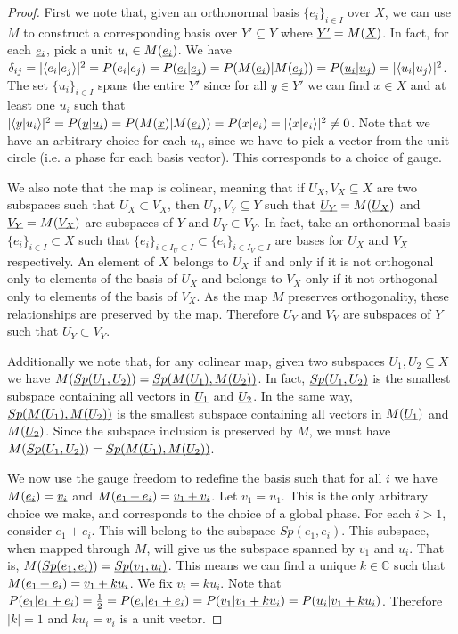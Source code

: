 \documentclass[aps,prl,amsmath,amssymb,twocolumn,nofootinbib]{revtex4}
\theoremstyle{plain}
\theoremstyle{definition}
\theoremstyle{remark}
\newcommand{\pj}[1] {\underbar{$#1$}}
\def\>{\rangle}
\def\<{\langle}
\begin{document}
	\begin{proof}
		First we note that, given an orthonormal basis $\{e_i\}_{i \in I}$ over $X$, we can use $M$ to construct a corresponding basis over $Y' \subseteq Y$ where $\pj{Y'} = M(\pj{X})$. In fact, for each $\pj{e_i}$, pick a unit $u_i \in M(\pj{e_i})$. We have $\delta_{ij} = |\<e_i | e_j \>|^2 = P(e_i | e_j) = P(\pj{e_i}|\pj{e_j}) = P(M(\pj{e_i})|M(\pj{e_j})) = P(\pj{u_i}|\pj{u_j})= |\<u_i | u_j \>|^2$. The set $\{u_i\}_{i \in I}$ spans the entire $Y'$ since for all $y \in Y'$ we can find $x \in X$ and at least one $u_i$ such that $|\<y | u_i \>|^2 = P(\pj{y}|\pj{u_i}) = P(M(\pj{x})|M(\pj{e_i})) = P(x | e_i) = |\<x | e_i \>|^2 \neq 0$. Note that we have an arbitrary choice for each $u_i$, since we have to pick a vector from the unit circle (i.e. a phase for each basis vector). This corresponds to a choice of gauge.
		
		We also note that the map is colinear, meaning that if $U_X, V_X \subseteq X$ are two subspaces such that $U_X \subset V_X$, then $U_Y, V_Y \subseteq Y$ such that $\pj{U_Y} = M(\pj{U_X})$ and $\pj{V_Y} = M(\pj{V_X})$ are subspaces of $Y$ and $U_Y \subset V_Y$. In fact, take an orthonormal basis $\{e_i\}_{i \in I} \subset X$ such that $\{e_i\}_{i \in I_U \subset I} \subset \{e_i\}_{i \in I_V \subset I}$ are bases for $U_X$ and $V_X$ respectively. An element of $X$ belongs to $U_X$ if and only if it is not orthogonal only to elements of the basis of $U_X$ and belongs to $V_X$ only if it not orthogonal only to elements of the basis of $V_X$. As the map $M$ preserves orthogonality, these relationships are preserved by the map. Therefore $U_Y$ and $V_Y$ are subspaces of $Y$ such that $U_Y \subset V_Y$.
		
		Additionally we note that, for any colinear map, given two subspaces $U_1, U_2 \subseteq X$ we have $M(\pj{Sp(U_1, U_2)}) = \pj{Sp(M(\pj{U_1}), M(\pj{U_2}))}$. In fact, $\pj{Sp(U_1,U_2)}$ is the smallest subspace containing all vectors in $\pj{U_1}$ and $\pj{U_2}$. In the same way, $\pj{Sp(M(U_1),M(U_2))}$ is the smallest subspace containing all vectors in $M(\pj{U_1})$ and $M(\pj{U_2})$. Since the subspace inclusion is preserved by $M$, we must have $M(\pj{Sp(U_1, U_2)}) = \pj{Sp(M(\pj{U_1}), M(\pj{U_2}))}$.
		
		We now use the gauge freedom to redefine the basis such that for all $i$ we have $M(\pj{e_i}) = \pj{v_i}$ and $M(\pj{e_1 + e_i}) = \pj{v_1 + v_i}$. Let $v_1 = u_1$. This is the only arbitrary choice we make, and corresponds to the choice of a global phase. For each $i>1$, consider $e_1 + e_i$. This will belong to the subspace $Sp(e_1, e_i)$. This subspace, when mapped through $M$, will give us the subspace spanned by $v_1$ and $u_i$. That is, $M(\pj{Sp(e_1, e_i)})=\pj{Sp(v_1, u_i)}$. This means we can find a unique $k \in \mathbb{C}$ such that $M(\pj{e_1+e_i})=\pj{v_1+ku_i}$. We fix $v_i = k u_i$. Note that $P(\pj{e_1} | \pj{e_1+e_i}) = \frac{1}{2}=  P(\pj{e_i} | \pj{e_1+e_i})=P(\pj{v_1} | \pj{v_1+k u_i})=P(\pj{u_i} | \pj{v_1+k u_i})$. Therefore $|k| = 1$ and $k u_i = v_i$ is a unit vector.
		

\end{proof}
\end{document}
